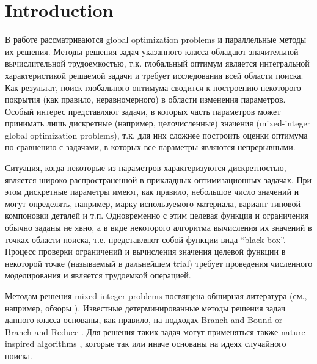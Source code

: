 \documentclass[
11pt,%
tightenlines,%
twoside,%
onecolumn,%
nofloats,%
nobibnotes,%
nofootinbib,%
superscriptaddress,%
noshowpacs,%
centertags]%
{revtex4}
\begin{document}

\section{Introduction}

В работе рассматриваются global optimization problems и параллельные методы их решения. Методы решения задач указанного класса  обладают значительной вычислительной трудоемкостью, т.к. глобальный оптимум является интегральной характеристикой решаемой задачи и требует исследования всей области поиска. Как результат, поиск глобального оптимума сводится к построению некоторого покрытия (как правило, неравномерного) в области изменения параметров. Особый интерес представляют задачи, в которых часть параметров может принимать лишь дискретные (например, целочисленные) значения (mixed-integer global optimization problems), т.к. для них сложнее построить оценки оптимума по сравнению с задачами, в которых все параметры являются непрерывными.

Ситуация, когда некоторые из параметров характеризуются дискретностью, является широко распространенной в прикладных оптимизационных задачах. При этом дискретные параметры имеют, как правило, небольшое число значений и могут определять, например, марку используемого материала, вариант типовой компоновки деталей и т.п. 
Одновременно с этим целевая функция и ограничения обычно заданы не явно, а в виде некоторого алгоритма вычисления их значений в точках области поиска, т.е. представляют собой функции вида “black-box”. Процесс проверки ограничений и вычисления значения целевой функции в некоторой точке (называемый в дальнейшем trial) требует проведения численного моделирования и является трудоемкой операцией. 

Методам решения mixed-integer problems посвящена обширная литература (см., например, обзоры \cite{Burer,Boukouvala}). Известные детерминированные методы решения задач данного класса основаны, как правило, на подходах Branch-and-Bound \cite{Belotti} or Branch-and-Reduce \cite{Vigerske}. Для решения таких задач могут применяться также nature-inspired algorithms \cite{Deep,Schluter}, которые так или иначе основаны на идеях случайного поиска.
\end{document}
